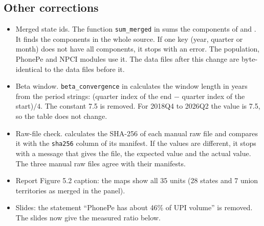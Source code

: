 \documentclass[11pt,a4paper]{article}
\begin{document}
\subsection{Other corrections}
\begin{itemize}
\item Merged state ids. The function \texttt{sum\_merged} in  sums the components of  and . It finds the components in the whole source. If one key (year, quarter or month) does not have all components, it stops with an error. The population, PhonePe and NPCI modules use it. The data files after this change are byte-identical to the data files before it.
\item Beta window. \texttt{beta\_convergence} in  calculates the window length in years from the period strings: (quarter index of the end $-$ quarter index of the start)$/4$. The constant 7.5 is removed. For 2018Q4 to 2026Q2 the value is 7.5, so the table does not change.
\item Raw-file check.  calculates the SHA-256 of each manual raw file and compares it with the \texttt{sha256} column of its manifest. If the values are different, it stops with a message that gives the file, the expected value and the actual value. The three manual raw files agree with their manifests.
\item Report Figure 5.2 caption: the maps show all 35 units (28 states and 7 union territories as merged in the panel).
\item Slides: the statement ``PhonePe has about 46\% of UPI volume'' is removed. The slides now give the measured ratio below.
\end{itemize}
\end{document}
